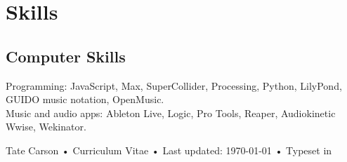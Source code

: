 \documentclass[10pt, a4paper]{article}
\begin{document}
\section*{Skills}

\subsection*{Computer Skills}
Programming: JavaScript, Max, SuperCollider, Processing, Python, LilyPond, GUIDO music notation, OpenMusic. \\
Music and audio apps: Ableton Live, Logic, Pro Tools, Reaper, Audiokinetic Wwise, Wekinator. 



\vfill{}

\begin{center}
{\scriptsize  Tate Carson •\- Curriculum Vitae •\- Last updated: \today\- •\- %
Typeset in \href{http://nitens.org/taraborelli/cvtex}{
\XeTeX }\\
}
\end{center}
\end{document}
